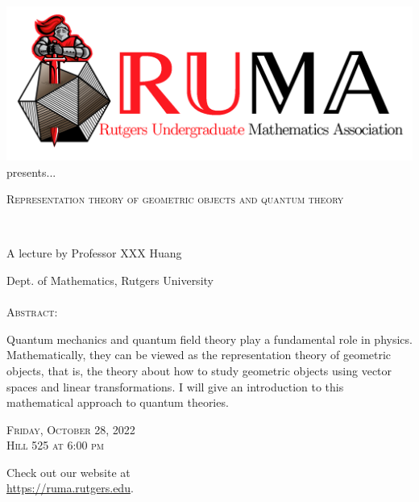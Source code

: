 \documentclass[12pt]{article}
\begin{document}

\begin{center}\includegraphics[scale=.3]{RUMAlogo.png}\\
\large  presents... \\

\vspace{2mm}
\begin{spacing}{2}
{\fontsize{42}{28}\selectfont  \textsc{
    Representation theory of geometric objects and quantum theory
    }} \end{spacing}
 
~~\\
\begin{spacing}{1}
{\fontsize{24}{24} \selectfont A lecture by Professor XXX Huang}  \end{spacing} 
\large Dept. of Mathematics, Rutgers University \\~~\\

\normalsize
\textsc{Abstract:}

\Large 
Quantum mechanics and quantum field theory play a fundamental role in physics. Mathematically, they can be viewed as the representation theory of geometric objects, that is, the theory about how to study geometric objects using vector spaces and linear transformations. I will give an introduction to this mathematical approach to quantum theories.


\begin{spacing}{2}
    {\fontsize{36}{28}\selectfont  \textsc{
        Friday, October 28, 2022 \\Hill 525 at 6:00 pm
    }} 
\end{spacing}

\Large  Check out our website at \\
\url{https://ruma.rutgers.edu}.
\end{center}
\end{document}
